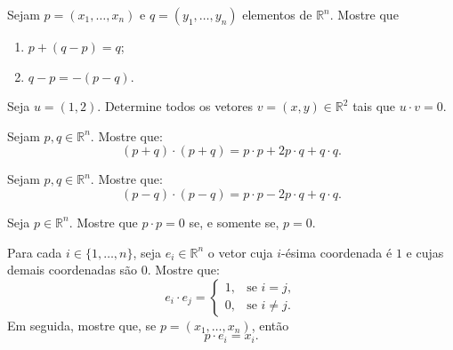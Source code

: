 \begin{exercise}
    Sejam $p=(x_1,\ldots,x_n)$ e $q=(y_1,\ldots,y_n)$ elementos de $\mathbb R^n$.
    Mostre que
    \begin{enumerate}[label=(\alph*)]
        \item $p+(q-p)=q$;
        \item $q-p=-(p-q)$.
    \end{enumerate}
\end{exercise}

\begin{exercise}
    Seja $u=(1,2)$.
    Determine todos os vetores $v=(x,y)\in\mathbb R^2$ tais que $u\cdot v=0$.
\end{exercise}

\begin{exercise}
    Sejam $p,q\in\mathbb R^n$.
    Mostre que:
    \[
        (p+q)\cdot(p+q)=p\cdot p+2p\cdot q+q\cdot q.
    \]
\end{exercise}

\begin{exercise}
    Sejam $p,q\in\mathbb R^n$.
    Mostre que:
    \[
        (p-q)\cdot(p-q)=p\cdot p-2p\cdot q+q\cdot q.
    \]
\end{exercise}

\begin{exercise}
    Seja $p\in\mathbb R^n$.
    Mostre que $p\cdot p=0$ se, e somente se, $p=0$.
\end{exercise}

\begin{exercise}
    Para cada $i\in\{1,\ldots,n\}$, seja $e_i\in\mathbb R^n$ o vetor cuja $i$-ésima coordenada é $1$ e cujas demais coordenadas são $0$.
    Mostre que:
    \[
        e_i\cdot e_j=
        \begin{cases}
            1, & \text{se } i=j,\\
            0, & \text{se } i\neq j.
        \end{cases}
    \]
    Em seguida, mostre que, se $p=(x_1,\ldots,x_n)$, então
    \[
        p\cdot e_i=x_i.
    \]
\end{exercise}
